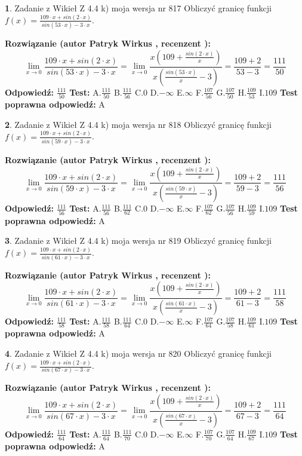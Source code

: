 \documentclass[12pt, a4paper]{article}
\theoremstyle{definition} %
\newtheorem{zad}{}
\newcommand{\zadStart}[1]{\begin{zad}#1\newline}
\newcommand{\zadStop}{\end{zad}}
\newcommand{\rozwStart}[2]{\noindent \textbf{Rozwiązanie (autor #1 , recenzent #2): }\newline}
\newcommand{\rozwStop}{\newline}
\newcommand{\odpStart}{\noindent \textbf{Odpowiedź:}\newline}
\newcommand{\odpStop}{\newline}
\newcommand{\testStart}{\noindent \textbf{Test:}\newline}
\newcommand{\testStop}{\newline}
\newcommand{\kluczStart}{\noindent \textbf{Test poprawna odpowiedź:}\newline}
\newcommand{\kluczStop}{\newline}
\begin{document}
\zadStart{Zadanie z Wikieł Z 4.4 k) moja wersja nr 817}
Obliczyć granicę funkcji $f(x)=\frac{109\cdot x +sin(2\cdot x)}{sin(53\cdot x) -3\cdot x}$.
\zadStop
\rozwStart{Patryk Wirkus}{}
$$\lim\limits_{x\to 0}\frac{109\cdot x +sin(2\cdot x)}{sin(53\cdot x) -3\cdot x}
=\lim\limits_{x\to 0}\frac{x(109+\frac{sin(2\cdot x)}{x})}{x(\frac{sin(53\cdot x)}{x}-3)}
=\frac{109+2}{53-3} = \frac{111}{50}$$
\rozwStop
\odpStart
$\frac{111}{50}$
\odpStop
\testStart
A.$\frac{111}{50}$
B.$\frac{111}{56}$
C.$0$
D.$-\infty$
E.$\infty$
F.$\frac{107}{56}$
G.$\frac{107}{50}$
H.$\frac{109}{53}$
I.$109$
\testStop
\kluczStart
A
\kluczStop



\zadStart{Zadanie z Wikieł Z 4.4 k) moja wersja nr 818}
Obliczyć granicę funkcji $f(x)=\frac{109\cdot x +sin(2\cdot x)}{sin(59\cdot x) -3\cdot x}$.
\zadStop
\rozwStart{Patryk Wirkus}{}
$$\lim\limits_{x\to 0}\frac{109\cdot x +sin(2\cdot x)}{sin(59\cdot x) -3\cdot x}
=\lim\limits_{x\to 0}\frac{x(109+\frac{sin(2\cdot x)}{x})}{x(\frac{sin(59\cdot x)}{x}-3)}
=\frac{109+2}{59-3} = \frac{111}{56}$$
\rozwStop
\odpStart
$\frac{111}{56}$
\odpStop
\testStart
A.$\frac{111}{56}$
B.$\frac{111}{62}$
C.$0$
D.$-\infty$
E.$\infty$
F.$\frac{107}{62}$
G.$\frac{107}{56}$
H.$\frac{109}{59}$
I.$109$
\testStop
\kluczStart
A
\kluczStop



\zadStart{Zadanie z Wikieł Z 4.4 k) moja wersja nr 819}
Obliczyć granicę funkcji $f(x)=\frac{109\cdot x +sin(2\cdot x)}{sin(61\cdot x) -3\cdot x}$.
\zadStop
\rozwStart{Patryk Wirkus}{}
$$\lim\limits_{x\to 0}\frac{109\cdot x +sin(2\cdot x)}{sin(61\cdot x) -3\cdot x}
=\lim\limits_{x\to 0}\frac{x(109+\frac{sin(2\cdot x)}{x})}{x(\frac{sin(61\cdot x)}{x}-3)}
=\frac{109+2}{61-3} = \frac{111}{58}$$
\rozwStop
\odpStart
$\frac{111}{58}$
\odpStop
\testStart
A.$\frac{111}{58}$
B.$\frac{111}{64}$
C.$0$
D.$-\infty$
E.$\infty$
F.$\frac{107}{64}$
G.$\frac{107}{58}$
H.$\frac{109}{61}$
I.$109$
\testStop
\kluczStart
A
\kluczStop



\zadStart{Zadanie z Wikieł Z 4.4 k) moja wersja nr 820}
Obliczyć granicę funkcji $f(x)=\frac{109\cdot x +sin(2\cdot x)}{sin(67\cdot x) -3\cdot x}$.
\zadStop
\rozwStart{Patryk Wirkus}{}
$$\lim\limits_{x\to 0}\frac{109\cdot x +sin(2\cdot x)}{sin(67\cdot x) -3\cdot x}
=\lim\limits_{x\to 0}\frac{x(109+\frac{sin(2\cdot x)}{x})}{x(\frac{sin(67\cdot x)}{x}-3)}
=\frac{109+2}{67-3} = \frac{111}{64}$$
\rozwStop
\odpStart
$\frac{111}{64}$
\odpStop
\testStart
A.$\frac{111}{64}$
B.$\frac{111}{70}$
C.$0$
D.$-\infty$
E.$\infty$
F.$\frac{107}{70}$
G.$\frac{107}{64}$
H.$\frac{109}{67}$
I.$109$
\testStop
\kluczStart
A
\kluczStop
\end{document}
